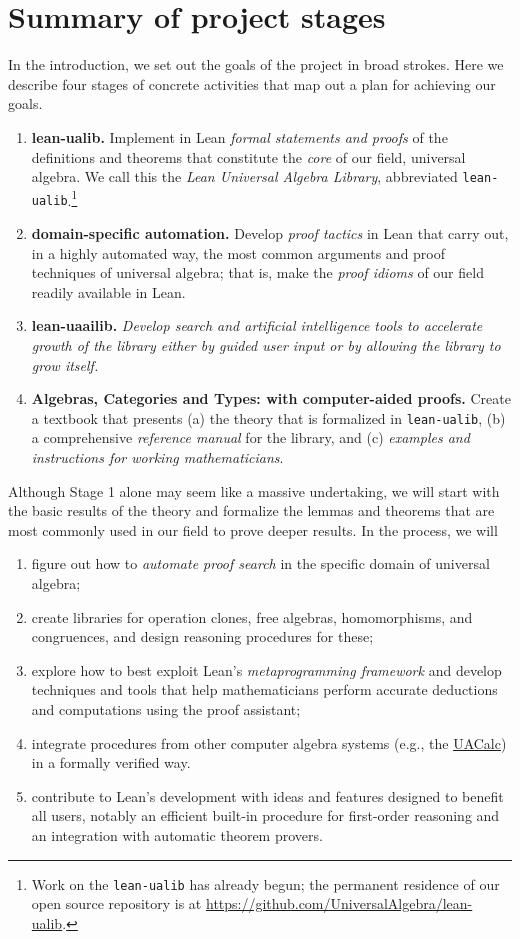 \documentclass[11pt]{amsart}  %
\begin{document}
\section{Summary of project stages}
In the introduction, we set out the goals of the project in broad strokes. 
Here we describe four stages of concrete activities that map out a plan for 
achieving our goals.
\begin{enumerate}
\item[Stage 1.] {\bf lean-ualib.} Implement in Lean \textsl{formal statements and proofs} of the definitions and theorems that constitute the \textsl{core} of our field, universal algebra.
  We call this the \textsl{Lean Universal Algebra Library}, abbreviated {\tt lean-ualib}.\footnote{Work on the {\tt lean-ualib} has already begun; the permanent residence of 
  our open source repository is at \href{https://github.com/UniversalAlgebra/lean-ualib}{https://github.com/UniversalAlgebra/lean-ualib}.}
\item[Stage 2.] {\bf domain-specific automation.} Develop \textsl{proof tactics} in Lean that carry out, in a highly automated way, the most common arguments and proof techniques of universal algebra; that is, make the \textsl{proof idioms} of our field readily available in Lean.
\item[Stage 3.] {\bf lean-uaailib.}  \textsl{Develop search and artificial intelligence tools to accelerate growth of the library either by guided user input or by allowing the
  library to grow itself.}
\item[Stage 4.] {\bf Algebras, Categories and Types: with computer-aided proofs.} Create a textbook that presents (a) the theory that is formalized in {\tt lean-ualib}, (b) a comprehensive \textsl{reference manual} for the library, and (c) \emph{examples and instructions for working mathematicians}.
\end{enumerate}  
 
Although Stage 1 alone may seem like a massive undertaking, we will start with the
basic results of the theory and formalize the lemmas and theorems that are most commonly
used in our field to prove deeper results.
In the process, we will
\begin{enumerate}
  \item figure out how to \emph{automate proof search} in the specific domain of universal algebra;
  \item create libraries for operation clones, free algebras, homomorphisms, and congruences, and design reasoning procedures for these;
  \item explore how to best exploit Lean's \emph{metaprogramming framework} and develop techniques and tools that help mathematicians perform accurate deductions and computations using the proof assistant;
  \item integrate procedures from other computer algebra systems (e.g., the \href{http://uacalc.org}{UACalc}) in a formally verified way.
  \item contribute to Lean's development with ideas and features designed to benefit all users, notably an efficient built-in procedure for first-order reasoning and an integration with automatic theorem provers.
\end{enumerate}
\end{document}
